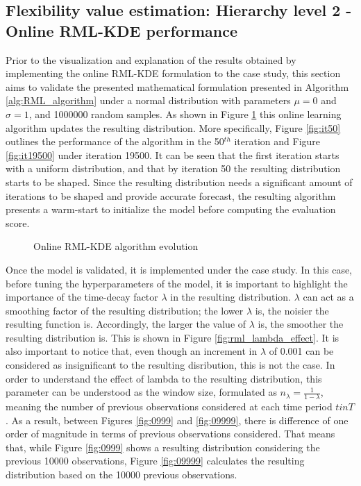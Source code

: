 \subsection{Flexibility value estimation: Hierarchy level 2 - Online RML-KDE performance}\label{Sect:ResultRMLalgorithm}

Prior to the visualization and explanation of the results obtained by implementing the online RML-KDE formulation to the case study, this section aims to validate the presented mathematical formulation presented in Algorithm \ref{alg:RML_algorithm} under a normal distribution with parameters $\mu = 0$ and $\sigma = 1$, and 1000000 random samples. As shown in Figure \ref{fig:rml_evolution} this online learning algorithm updates the resulting distribution.  More specifically, Figure \ref{fig:it50} outlines the performance of the algorithm in the 50$^{th}$ iteration and Figure \ref{fig:it19500} under iteration 19500. It can be seen that the first iteration starts with a uniform distribution, and that by iteration 50 the resulting distribution starts to be shaped. Since the resulting distribution needs a significant amount of iterations to be shaped and provide accurate forecast, the resulting algorithm presents a warm-start to initialize the model before computing the evaluation score.

\begin{figure}[ht!]
\centering     %
{}
\caption{Online RML-KDE algorithm evolution}
\label{fig:rml_evolution}
\end{figure}

Once the model is validated, it is implemented under the case study. In this case, before tuning the hyperparameters of the model, it is important to highlight the importance of the time-decay factor $\lambda$ in the resulting distribution. $\lambda$ can act as a smoothing factor of the resulting distribution; the lower $\lambda$ is, the noisier the resulting function is. Accordingly, the larger the value of $\lambda$ is, the smoother the resulting distribution is. This is shown in Figure \ref{fig:rml_lambda_effect}. It is also important to notice that, even though an increment in $\lambda$ of 0.001 can be considered as insignificant to the resulting disribution, this is not the case. In order to understand the effect of lambda to the resulting distribution, this parameter can be understood as the window size, formulated as $n_{\lambda} = \frac{1}{1-\lambda}$, meaning the number of previous observations considered at each time period $t in T$. As a result, between Figures \ref{fig:0999} and \ref{fig:09999}, there is difference of one order of magnitude in terms of previous observations considered. That means that, while Figure \ref{fig:0999} shows a resulting distribution considering the previous 10000 observations, Figure \ref{fig:09999} calculates the resulting distribution based on the 10000 previous observations. 

